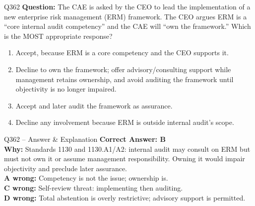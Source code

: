 \documentclass[aspectratio=169,10pt]{beamer}
\begin{document}
	\begin{frame}[t]{Q362}
		\small
		\textbf{Question:} The CAE is asked by the CEO to lead the implementation of a new enterprise risk management (ERM) framework. The CEO argues ERM is a ``core internal audit competency'' and the CAE will ``own the framework.'' Which is the MOST appropriate response?
		\begin{enumerate}[label=\Alph*.,itemsep=1pt,topsep=2pt]
			\item Accept, because ERM is a core competency and the CEO supports it.
			\item Decline to own the framework; offer advisory/consulting support while management retains ownership, and avoid auditing the framework until objectivity is no longer impaired.
			\item Accept and later audit the framework as assurance.
			\item Decline any involvement because ERM is outside internal audit's scope.
		\end{enumerate}
	\end{frame}
	
	\begin{frame}[t]{Q362 -- Answer \& Explanation}
		\small
		\textbf{Correct Answer: B} \\[4pt]
		\textbf{Why:} Standards 1130 and 1130.A1/A2: internal audit may consult on ERM but must not own it or assume management responsibility. Owning it would impair objectivity and preclude later assurance. \\[4pt]
		\textbf{A wrong:} Competency is not the issue; ownership is. \\[2pt]
		\textbf{C wrong:} Self-review threat: implementing then auditing. \\[2pt]
		\textbf{D wrong:} Total abstention is overly restrictive; advisory support is permitted.
	\end{frame}
	
\end{document}
